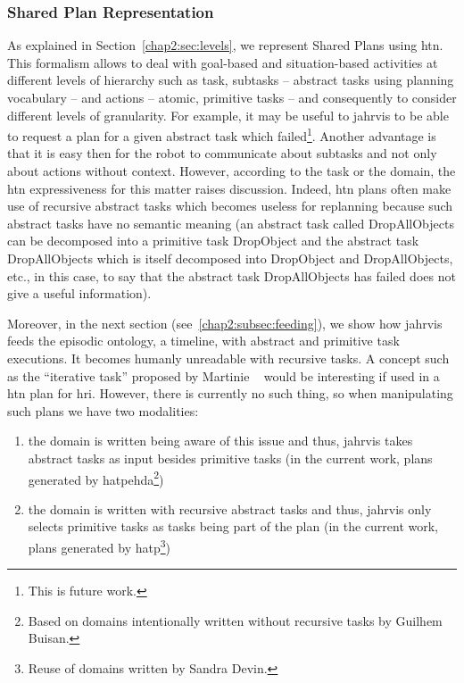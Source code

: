 \documentclass[a4paper,11pt,twoside]{StyleThese}
\begin{document}
\subsubsection{Shared Plan Representation}\label{chap2:subsubsec:shared_p_rep}
As explained in Section~\ref{chap2:sec:levels}, we represent Shared Plans using \acrfull{htn}. This formalism allows to deal with goal-based and situation-based activities at different levels of hierarchy such as task, subtasks -- abstract tasks using planning vocabulary -- and actions -- atomic, primitive tasks -- and consequently to consider different levels of granularity. For example, it may be useful to \acrshort{jahrvis} to be able to request a plan for a given abstract task which failed\footnote{This is future work.}. Another advantage is that it is easy then for the robot to communicate about subtasks and not only about actions without context. However, according to the task or the domain, the \acrshort{htn} expressiveness for this matter raises discussion. Indeed, \acrshort{htn} plans often make use of recursive abstract tasks which becomes useless for replanning because such abstract tasks have no semantic meaning (\eg an abstract task called DropAllObjects can be decomposed into a primitive task DropObject and the abstract task DropAllObjects which is itself decomposed into DropObject and DropAllObjects, etc., in this case, to say that the abstract task DropAllObjects has failed does not give a useful information). 

Moreover, in the next section (see~\ref{chap2:subsec:feeding}), we show how \acrshort{jahrvis} feeds the episodic ontology, a timeline, with abstract and primitive task executions. It becomes humanly unreadable with recursive tasks. A concept such as the ``iterative task'' proposed by Martinie \etal{}~\cite{martinie_2011_structuring} would be interesting if used in a \acrshort{htn} plan for \acrshort{hri}. However, there is currently no such thing, so when manipulating such plans we have two modalities:
\begin{enumerate}
	\item the domain is written being aware of this issue and thus, \acrshort{jahrvis} takes abstract tasks as input besides primitive tasks (\ie in the current work, plans generated by \acrshort{hatpehda}\footnote{Based on domains intentionally written without recursive tasks by Guilhem Buisan.})
	\item the domain is written with recursive abstract tasks and thus, \acrshort{jahrvis} only selects primitive tasks as tasks being part of the plan (\ie in the current work, plans generated by \acrshort{hatp}\footnote{Reuse of domains written by Sandra Devin.})
\end{enumerate}
\end{document}
